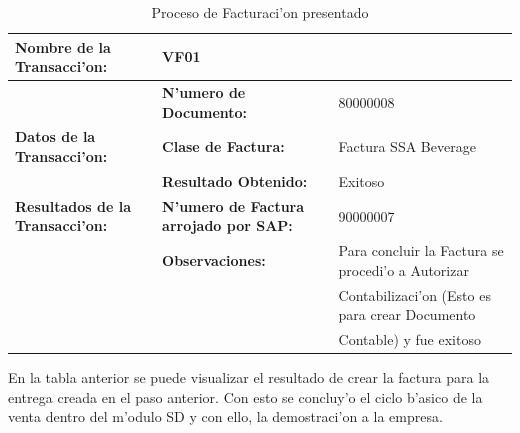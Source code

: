 \begin{table}[h!]
\footnotesize
\scalebox{0.8} {
\begin{tabular}{l l l}
\toprule
\textbf{Nombre de la Transacci'on:} & VF01 &\\
\midrule
                 & \textbf{N'umero de Documento:} &  80000008 \\
                 \cmidrule{2-3}
  \textbf{Datos de la Transacci'on:}                  & \textbf{Clase de Factura:} & Factura SSA Beverage \\
                 \midrule
                 & \textbf{Resultado Obtenido:} & Exitoso \\
                 \cmidrule{2-3}
\textbf{Resultados de la Transacci'on:}    & \textbf{N'umero de Factura arrojado por SAP:} & 90000007 \\
                 \cmidrule{2-3}
                 & \textbf{Observaciones:} &  Para concluir la Factura se procedi'o a Autorizar \\
                 &                                      & Contabilizaci'on (Esto es para crear Documento \\
                 &                                      & Contable) y fue exitoso\\
                 \bottomrule
\end{tabular}}
\caption{Proceso de Facturaci'on presentado}
\label{tb:facturacion}
\end{table}
	En la tabla anterior se puede visualizar el resultado de crear la factura para la entrega creada en el paso anterior. Con esto se concluy'o el ciclo b'asico de la venta dentro del m'odulo SD y con ello, la demostraci'on a la empresa.